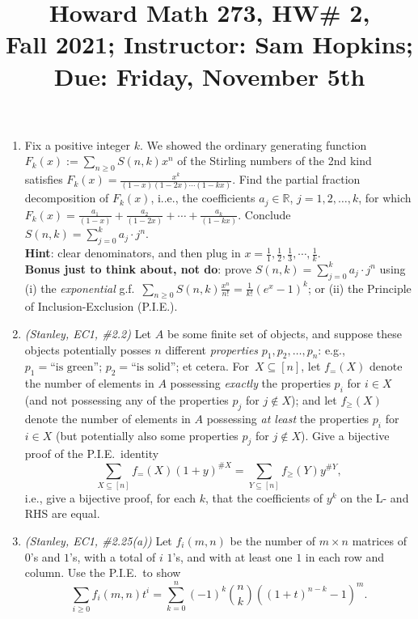 \documentclass[11pt]{article}
\title{Howard Math 273, HW\# 2, \\ {\normalsize Fall 2021; Instructor: Sam Hopkins; Due: Friday, November 5th}}
\date{}
\begin{document}
\maketitle

\thispagestyle{empty}

\vspace{-1.8cm}

\begin{enumerate}

\item Fix a positive integer $k$. We showed the ordinary generating function $F_k(x) := \sum_{n\geq 0}S(n,k)x^n$ of the Stirling numbers of the 2nd kind satisfies $F_k(x) = \frac{x^k}{(1-x)(1-2x)\cdots(1-kx)}$. Find the partial fraction decomposition of $F_k(x)$, i..e., the coefficients $a_j \in \mathbb{R}$, $j=1,2,\ldots,k$, for which $F_k(x) = \frac{a_1}{(1-x)} + \frac{a_2}{(1-2x)} + \cdots + \frac{a_k}{(1-kx)}$. Conclude $S(n,k) = \sum_{j=0}^{k} a_j \cdot j^n$. \\
{\bf Hint}: clear denominators, and then plug in $x=\frac{1}{1}, \frac{1}{2}, \frac{1}{3}, \cdots, \frac{1}{k}$. \\
{\bf Bonus just to think about, not do}: prove $S(n,k) = \sum_{j=0}^{k} a_j \cdot j^n$ using (i) the \emph{exponential} g.f.~$\sum_{n \geq 0} S(n,k) \frac{x^n}{n!} = \frac{1}{k!}(e^x-1)^k$; or (ii) the Principle of Inclusion-Exclusion (P.I.E.).

\item \emph{(Stanley, EC1, \#2.2)} Let $A$ be some finite set of objects, and suppose these objects potentially posses $n$ different \emph{properties} $p_1,p_2,\ldots,p_n$: e.g., $p_1=\textrm{``is green''}$; $p_2=\textrm{``is solid''}$; et cetera.  For~$X\subseteq [n]$, let $f_{=}(X)$ denote the number of elements in $A$ possessing \emph{exactly} the properties $p_i$ for $i\in X$ (and not possessing any of the properties $p_j$ for $j\notin X$); and let $f_{\geq}(X)$ denote the number of elements in $A$ possessing \emph{at least} the properties $p_i$ for $i\in X$ (but potentially also some properties $p_j$ for $j\notin X$). Give a bijective proof of the P.I.E.~identity
\[ \sum_{X\subseteq [n]} f_{=}(X) (1+y)^{\# X} = \sum_{Y\subseteq [n]} f_{\geq}(Y) y^{\#Y},\]
i.e., give a bijective proof, for each $k$, that the coefficients of $y^k$ on the L- and RHS are equal.

\item \emph{(Stanley, EC1, \#2.25(a))} Let $f_i(m,n)$ be the number of $m\times n$ matrices of $0$'s and $1$'s, with a total of $i$ $1$'s, and with at least one $1$ in each row and column. Use the P.I.E.~to show
\[ \sum_{i \geq 0} f_i(m,n) t^i = \sum_{k=0}^{n}(-1)^k\binom{n}{k}( (1+t)^{n-k}-1)^m.\]


\end{enumerate}
\end{document}
